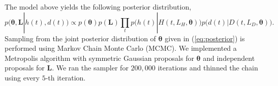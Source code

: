 \documentclass[11pt]{article}
\newcommand{\bL}{\mathbf{L}}
\newcommand{\btheta}{\boldsymbol{\theta}}
\newcommand{\comments}[1]{[\textcolor{red}{#1}]}
\begin{document}


The model above yields the following posterior distribution,
\begin{equation}
p(\btheta, \bL | h(t), d(t)) \propto p(\btheta) p(\bL)
							 \prod_t p\big(h(t)| H(t, L_H, \btheta)\big)
							         p\big(d(t)| D(t, L_D, \btheta)\big).
\label{eq:posterior}
\end{equation}
Sampling from the joint posterior distribution of $\btheta$ given in (\ref{eq:posterior}) is performed using Markov Chain Monte Carlo (MCMC). We implemented a Metropolis algorithm with symmetric Gaussian proposals for $\btheta$ and independent proposals for $\bL$. We ran the sampler for $200,000$ iterations and thinned the chain using every $5$-th iteration.


\end{document}
